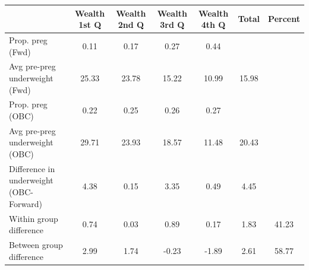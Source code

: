 \begin{tabular}{l*{6}{c}}
\toprule
            &\multicolumn{1}{c}{Wealth 1st Q}&\multicolumn{1}{c}{Wealth 2nd Q}&\multicolumn{1}{c}{Wealth 3rd Q}&\multicolumn{1}{c}{Wealth 4th Q}&\multicolumn{1}{c}{Total}&\multicolumn{1}{c}{Percent}\\
\midrule
\midrule
Prop. preg (Fwd)&        0.11&        0.17&        0.27&        0.44&            &            \\
Avg pre-preg underweight (Fwd)&       25.33&       23.78&       15.22&       10.99&       15.98&            \\
Prop. preg (OBC)&        0.22&        0.25&        0.26&        0.27&            &            \\
Avg pre-preg underweight (OBC)&       29.71&       23.93&       18.57&       11.48&       20.43&            \\
Difference in underweight (OBC-Forward)&        4.38&        0.15&        3.35&        0.49&        4.45&            \\
Within group difference&        0.74&        0.03&        0.89&        0.17&        1.83&       41.23\\
Between group difference&        2.99&        1.74&       -0.23&       -1.89&        2.61&       58.77\\
\bottomrule
\end{tabular}
